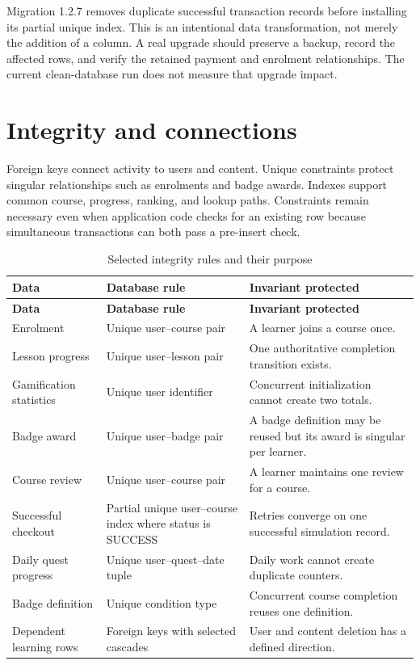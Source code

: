 \documentclass[12pt,a4paper,oneside]{report}
\begin{document}
Migration 1.2.7 removes duplicate successful transaction records before installing
its partial unique index. This is an intentional data transformation, not merely
the addition of a column. A real upgrade should preserve a backup, record the
affected rows, and verify the retained payment and enrolment relationships. The
current clean-database run does not measure that upgrade impact.

\section{Integrity and connections}
Foreign keys connect activity to users and content. Unique constraints protect
singular relationships such as enrolments and badge awards. Indexes support common
course, progress, ranking, and lookup paths. Constraints remain necessary even when
application code checks for an existing row because simultaneous transactions can
both pass a pre-insert check.

\begin{longtable}{P{0.27\textwidth}P{0.31\textwidth}P{0.31\textwidth}}
\caption{Selected integrity rules and their purpose}\label{tab:constraints}\\\toprule
\textbf{Data} & \textbf{Database rule} & \textbf{Invariant protected}\\\midrule\endfirsthead
\toprule\textbf{Data} & \textbf{Database rule} & \textbf{Invariant protected}\\\midrule\endhead
Enrolment & Unique user--course pair & A learner joins a course once.\\
Lesson progress & Unique user--lesson pair & One authoritative completion transition exists.\\
Gamification statistics & Unique user identifier & Concurrent initialization cannot create two totals.\\
Badge award & Unique user--badge pair & A badge definition may be reused but its award is singular per learner.\\
Course review & Unique user--course pair & A learner maintains one review for a course.\\
Successful checkout & Partial unique user--course index where status is SUCCESS & Retries converge on one successful simulation record.\\
Daily quest progress & Unique user--quest--date tuple & Daily work cannot create duplicate counters.\\
Badge definition & Unique condition type & Concurrent course completion reuses one definition.\\
Dependent learning rows & Foreign keys with selected cascades & User and content deletion has a defined direction.\\
\bottomrule
\end{longtable}
\end{document}

